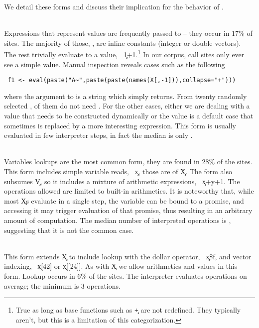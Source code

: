 \documentclass[screen,acmsmall]{acmart}
\begin{document}
\noindent
We detail these forms and discuss their implication for the behavior of \eval.

\newcommand{\EE}[1]{{{\emph{\framebox{#1}}}}\\[1mm]}

\medskip\noindent\EE{$min(e)=\c{V}$} Expressions that represent values are
frequently passed to \eval -- they occur in 17\% of sites. The majority of
those, \packageValOneNodePercent, are inline constants (integer or double
vectors). The rest trivially evaluate to a value, \eg~\c{1+1}.\footnote{True as
long as base functions such as \c{+} are not redefined. They typically aren't,
but this is a limitation of this categorization.} In our corpus,
\packageNbCallSitesUniqueActualValue call sites only ever see a simple value.
Manual inspection reveals cases such as the following
\begin{lstlisting}
 f1 <- eval(paste("A~",paste(paste(names(X[,-1])),collapse="+")))
\end{lstlisting}
where the argument to \eval is a string which \eval simply returns. From twenty
randomly selected \evals, \packageUsefulValueEvalPercent of them do not need
\eval. For the other cases, either we are dealing with a value that needs to be
constructed dynamically or the value is a default case that sometimes is
replaced by a more interesting expression. This form is usually evaluated in few
interpreter steps, in fact the median is only
\packageMinimizedmedianoperationscRnd.

\medskip\noindent\EE{$min(e)=\c{X}$} Variables lookups are the most common form,
they are found in 28\% of the sites. This form includes simple variable reads,
\eg~\c{x}, those are \packageNbSymbolVarSitePercent of \c X. The form also
subsumes \c{V}, so it includes a mixture of arithmetic expressions,
\eg~\c{x+y+1}. The operations allowed are limited to built-in arithmetics. It is
noteworthy that, while most \c{X}\!s evaluate in a single step, the variable can
be bound to a promise, and accessing it may trigger evaluation of that promise,
thus resulting in an arbitrary amount of computation. The median number of
interpreted operations is \packageMinimizedmedianoperationsaRnd, suggesting that
it is not the common case.

\newpage
\medskip\noindent\EE{$min(e)=\c{\$}$} This form extends \c X to include lookup
with the dollar operator, \eg~\c{x\$f}, and vector indexing, \eg~\c{x[42]} or
\c{x[[24]]}. As with \c X we allow arithmetics and values in this form. Lookup
occurs in 6\% of the sites. The interpreter evaluates
\packageMinimizedmedianoperationsgRnd operations on average; the minimum is 3
operations.
\end{document}
